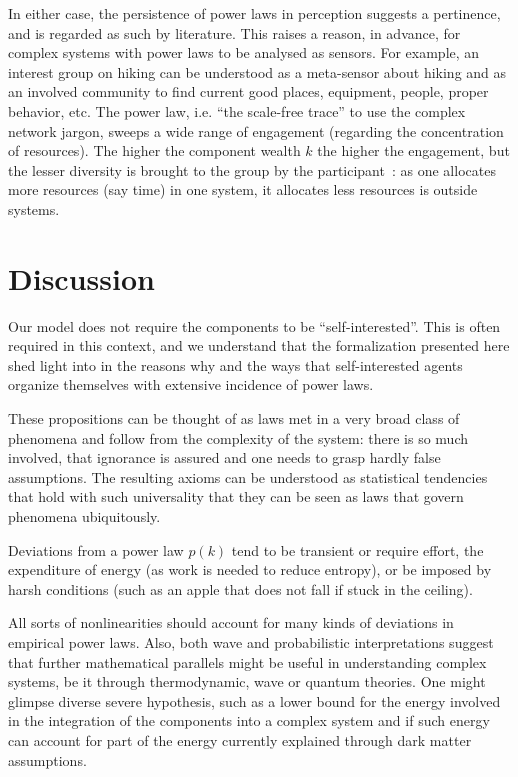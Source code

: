 \documentclass[a4paper, 11pt]{article} %
\begin{document}
In either case, the persistence of power laws in perception
suggests a pertinence, and is regarded as such by literature.
This raises a reason, in advance, for complex systems with power laws
to be analysed as sensors.
For example, an interest group on hiking can be understood as
a meta-sensor about hiking and as an involved community to find current good
places, equipment, people, proper behavior, etc.
The power law, i.e. ``the scale-free trace'' to use
the complex network jargon, sweeps a wide
range of engagement (regarding the concentration of resources).
The higher the component wealth $k$ the higher the engagement,
but the lesser diversity is brought to the group
by the participant~\cite{tStable}: 
as one allocates more resources (say time)
in one system,
it allocates less resources is outside systems.



\section{Discussion}
Our model does not require the components to be ``self-interested''.
This is often required in this context, and 
we understand that the formalization presented here shed light into in the reasons why and the ways that self-interested agents
organize themselves with extensive incidence of power laws.

These propositions can be thought of as laws met in
a very broad class of phenomena and
follow from the complexity of the system:
there is so much involved, that ignorance is assured and
one needs to grasp hardly false assumptions.
The resulting axioms can be understood as statistical tendencies that
hold with such universality that they can be seen as laws
that govern phenomena ubiquitously.

Deviations from a power law $p(k)$ tend to be transient or require effort, the expenditure of energy (as work is needed to reduce entropy), or be imposed by harsh conditions (such as an apple that does not fall if stuck in the ceiling).

All sorts of nonlinearities should account
for many kinds of deviations in empirical power laws.
Also,
both wave and probabilistic interpretations
suggest that further mathematical
parallels might be useful in understanding complex
systems, be it through thermodynamic, wave or quantum theories.
One might glimpse diverse severe hypothesis,
such as a lower bound for the energy involved in the integration of
the components into a complex system and
if such energy can account for part of the energy
currently explained through dark matter assumptions.
\end{document}
